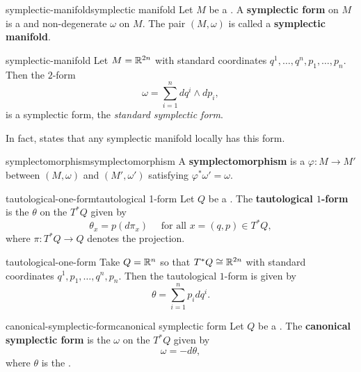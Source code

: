 \begin{topic}{symplectic-manifold}{symplectic manifold}
    Let $M$ be a . A \textbf{symplectic form} on $M$ is a  and non-degenerate  $\omega$ on $M$. The pair $(M, \omega)$ is called a \textbf{symplectic manifold}.
\end{topic}

\begin{example}{symplectic-manifold}
    Let $M = \mathbb{R}^{2n}$ with standard coordinates $q^1, \ldots, q^n, p_1, \ldots, p_n$. Then the $2$-form
    \[ \omega = \sum_{i = 1}^{n} d q^i \wedge d p_i , \]
    is a symplectic form, the \textit{standard symplectic form}.
    
    In fact,  states that any symplectic manifold locally has this form.
\end{example}

\begin{topic}{symplectomorphism}{symplectomorphism}
    A \textbf{symplectomorphism} is a  $\varphi : M \to M'$ between  $(M, \omega)$ and $(M', \omega')$ satisfying $\varphi^* \omega' = \omega$.
\end{topic}

\begin{topic}{tautological-one-form}{tautological 1-form}
    Let $Q$ be a . The \textbf{tautological $1$-form} is the  $\theta$ on the  $T^*Q$ given by
    \[ \theta_x = p(d \pi_x) \quad \text{ for all } x = (q, p) \in T^*Q , \]
    where $\pi : T^*Q \to Q$ denotes the projection.
\end{topic}

\begin{example}{tautological-one-form}
    Take $Q = \mathbb{R}^n$ so that $T^* Q \cong \mathbb{R}^{2n}$ with standard coordinates $q^1, p_1, \ldots, q^n, p_n$. Then the tautological $1$-form is given by
    \[ \theta = \sum_{i = 1}^{n} p_i dq^i . \]
\end{example}

\begin{topic}{canonical-symplectic-form}{canonical symplectic form}
    Let $Q$ be a . The \textbf{canonical symplectic form} is the  $\omega$ on the  $T^* Q$ given by
    \[ \omega = -d \theta , \]
    where $\theta$ is the .
\end{topic}

